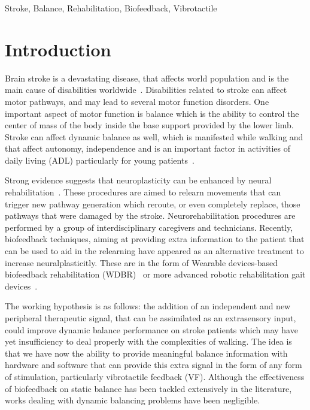 \documentclass[conference]{IEEEtran}
\begin{document}
\begin{IEEEkeywords}
Stroke, Balance, Rehabilitation, Biofeedback, Vibrotactile
\end{IEEEkeywords}

\section{Introduction}

Brain stroke is a devastating disease, that affects world population and is the main cause of disabilities worldwide~\cite{Caplan.etal2023}.  Disabilities related to stroke can affect motor pathways, and may lead to several motor function disorders.   One important aspect of motor function is balance which is the ability to control the center of mass of the body inside the base support provided by the lower limb.  Stroke can affect dynamic balance as well,  which is manifested while walking and that affect autonomy, independence and is an important factor in activities of daily living (ADL) particularly for young patients~\cite{Afrasiabifar.etal2020,Donato.etal2016}.


Strong evidence suggests that neuroplasticity can be enhanced by neural rehabilitation~\cite{DeAngelis.etal2021,Albert.etal2012}.  These procedures are aimed to relearn movements that can trigger new pathway generation which reroute, or even completely replace, those pathways that were damaged by the stroke.  Neurorehabilitation procedures are performed by a group of interdisciplinary caregivers and technicians.  Recently, biofeedback techniques, aiming at providing extra information to the patient that can be used to aid in the relearning have appeared as an alternative treatment to increase neuralplasticitly. These are in the form of Wearable devices-based biofeedback rehabilitation (WDBR)~\cite{Peake.etal2018} or more advanced robotic rehabilitation gait devices~\cite{Zhao.etal2022,Peshkin.etal2005,Tong.etal2006}.  


The working hypothesis is as follows:  the addition of an independent and new peripheral therapeutic signal, that can be assimilated as an extrasensory input,  could improve dynamic balance performance on stroke patients which may have yet insufficiency to deal properly with the complexities of walking.  The idea is that we have now the ability to provide meaningful balance information with hardware and software that can provide this extra signal in the form of any form of stimulation, particularly vibrotactile feedback (VF).  Although the effectiveness of biofeedback on static balance has been tackled extensively in the literature, works dealing with dynamic balancing problems have been negligible.
\end{document}
